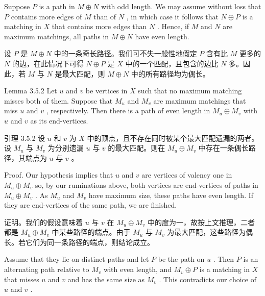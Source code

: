 \documentclass[10pt]{article}
\begin{document}
Suppose \(P\) is a path in \(M \oplus  N\) with odd length. We may assume without loss that \(P\) contains more edges of \(M\) than of \(N\) , in which case it follows that \(N \oplus  P\) is a matching in \(X\) that contains more edges than \(N\) . Hence, if \(M\) and \(N\) are maximum matchings, all paths in \(M \oplus  N\) have even length.

\begin{tcolorbox}\relax
设 \(P\) 是 \(M \oplus  N\) 中的一条奇长路径。我们可不失一般性地假定 \(P\) 含有比 \(M\) 更多的 \(N\) 的边，在此情况下可得 \(N \oplus  P\) 是 \(X\) 中的一个匹配，且包含的边比 \(N\) 多。因此，若 \(M\) 与 \(N\) 是最大匹配，则 \(M \oplus  N\) 中的所有路径均为偶长。
\end{tcolorbox}

Lemma 3.5.2 Let \(u\) and \(v\) be vertices in \(X\) such that no maximum matching misses both of them. Suppose that \({M}_{u}\) and \({M}_{v}\) are maximum matchings that miss \(u\) and \(v\) , respectively. Then there is a path of even length in \({M}_{u} \oplus  {M}_{v}\) with \(u\) and \(v\) as its end-vertices.

\begin{tcolorbox}\relax
引理 3.5.2 设 \(u\) 和 \(v\) 为 \(X\) 中的顶点，且不存在同时被某个最大匹配遗漏的两者。设 \({M}_{u}\) 与 \({M}_{v}\) 为分别遗漏 \(u\) 与 \(v\) 的最大匹配。则在 \({M}_{u} \oplus  {M}_{v}\) 中存在一条偶长路径，其端点为 \(u\) 与 \(v\) 。
\end{tcolorbox}

Proof. Our hypothesis implies that \(u\) and \(v\) are vertices of valency one in \({M}_{u} \oplus  {M}_{v}\) so, by our ruminations above, both vertices are end-vertices of paths in \({M}_{u} \oplus  {M}_{v}\) . As \({M}_{u}\) and \({M}_{v}\) have maximum size, these paths have even length. If they are end-vertices of the same path, we are finished.

\begin{tcolorbox}\relax
证明。我们的假设意味着 \(u\) 与 \(v\) 在 \({M}_{u} \oplus  {M}_{v}\) 中的度为一，故按上文推理，二者都是 \({M}_{u} \oplus  {M}_{v}\) 中某些路径的端点。由于 \({M}_{u}\) 与 \({M}_{v}\) 为最大匹配，这些路径为偶长。若它们为同一条路径的端点，则结论成立。
\end{tcolorbox}

Assume that they lie on distinct paths and let \(P\) be the path on \(u\) . Then \(P\) is an alternating path relative to \({M}_{v}\) with even length, and \({M}_{v} \oplus  P\) is a matching in \(X\) that misses \(u\) and \(v\) and has the same size as \({M}_{v}\) . This contradicts our choice of \(u\) and \(v\) .
\end{document}
